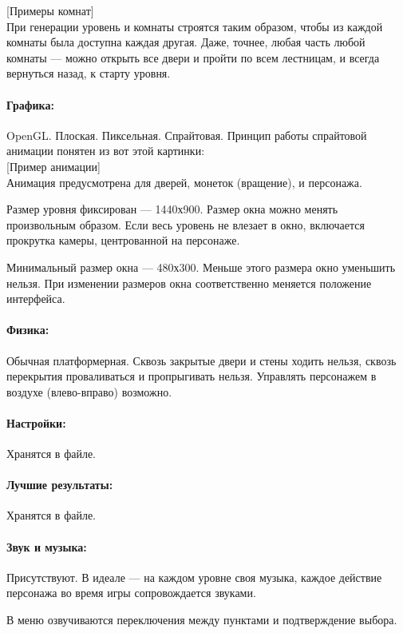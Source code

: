 \documentclass[12pt,a4paper]{article}
\begin{document}
{\color{blue}[Примеры комнат]}\\

При генерации уровень и комнаты строятся таким образом, чтобы из каждой комнаты была доступна каждая другая. Даже, точнее, любая часть любой комнаты --- можно открыть все двери и пройти по всем лестницам, и всегда вернуться назад, к старту уровня.

\paragraph{Графика:}
OpenGL. Плоская. Пиксельная. Спрайтовая. Принцип работы спрайтовой анимации понятен из вот этой картинки:\\

{\color{blue}[Пример анимации]}\\

Анимация предусмотрена для дверей, монеток (вращение), и персонажа.

Размер уровня фиксирован --- 1440х900. Размер окна можно менять произвольным образом. Если весь уровень не влезает в окно, включается прокрутка камеры, центрованной на персонаже.

Минимальный размер окна --- 480х300. Меньше этого размера окно уменьшить нельзя. При изменении размеров окна соответственно меняется положение интерфейса.

\paragraph{Физика:}
Обычная платформерная. Сквозь закрытые двери и стены ходить нельзя, сквозь перекрытия проваливаться и пропрыгивать нельзя. Управлять персонажем в воздухе (влево-вправо) возможно.

\paragraph{Настройки:}
Хранятся в файле.

\paragraph{Лучшие результаты:}
Хранятся в файле.

\paragraph{Звук и музыка:}
Присутствуют. В идеале --- на каждом уровне своя музыка, каждое действие персонажа во время игры сопровождается звуками.

В меню озвучиваются переключения между пунктами и подтверждение выбора.
\end{document}
